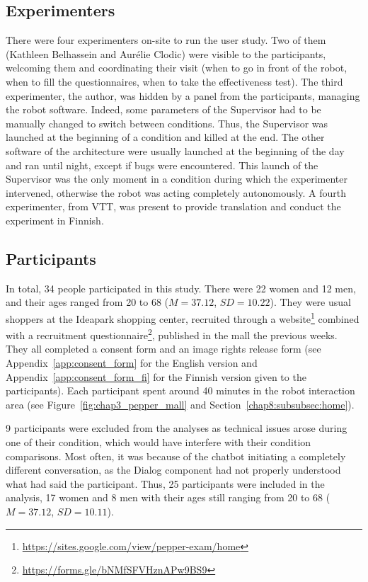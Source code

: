 \documentclass[a4paper,11pt,twoside]{StyleThese}
\begin{document}
\subsection{Experimenters}

There were four experimenters on-site to run the user study. Two of them (Kathleen Belhassein and Aurélie Clodic) were visible to the participants, welcoming them and coordinating their visit (when to go in front of the robot, when to fill the questionnaires, when to take the effectiveness test). The third experimenter, the author, was hidden by a panel from the participants, managing the robot software. Indeed, some parameters of the Supervisor had to be manually changed to switch between conditions. Thus, the Supervisor was launched at the beginning of a condition and killed at the end. The other software of the architecture were usually launched at the beginning of the day and ran until night, except if bugs were encountered. This launch of the Supervisor was the only moment in a condition during which the experimenter intervened, otherwise the robot was acting completely autonomously. A fourth experimenter, from VTT, was present to provide translation and conduct the experiment in Finnish.

\subsection{Participants}

In total, 34 people participated in this study. There were 22 women and 12 men, and their ages ranged from 20 to 68 ($M=37.12$, $SD=10.22$). They were usual shoppers at the Ideapark shopping center, recruited through a website\footnote{\url{https://sites.google.com/view/pepper-exam/home}} combined with a recruitment questionnaire\footnote{\url{https://forms.gle/bNMfSFVHznAPw9BS9}}, published in the mall the previous weeks. They all completed a consent form and an image rights release form (see Appendix~\ref{app:consent_form} for the English version and Appendix~\ref{app:consent_form_fi} for the Finnish version given to the participants). Each participant spent around 40 minutes in the robot interaction area (see Figure~\ref{fig:chap3_pepper_mall} and Section~\ref{chap8:subsubsec:home}).

9 participants were excluded from the analyses as technical issues arose during one of their condition, which would have interfere with their condition comparisons. Most often, it was because of the chatbot initiating a completely different conversation, as the Dialog component had not properly understood what had said the participant. Thus, 25 participants were included in the analysis, 17 women and 8 men with their ages still ranging from 20 to 68 ($M=37.12$, $SD=10.11$).
\end{document}
